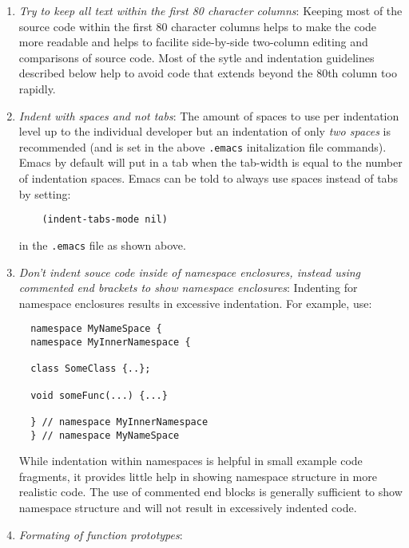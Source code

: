 \begin{enumerate}

{}\item\textit{Try to keep all text within the first 80 character columns}:
Keeping most of the source code within the first 80 character columns helps to
make the code more readable and helps to facilite side-by-side two-column
editing and comparisons of source code.  Most of the sytle and indentation
guidelines described below help to avoid code that extends beyond the 80th
column too rapidly.

{}\item\textit{Indent with spaces and not tabs}: The amount of spaces to use
per indentation level up to the individual developer but an indentation of
only {}\textit{two spaces} is recommended (and is set in the above
{}\texttt{.emacs} initalization file commands).  Emacs by default will put in
a tab when the tab-width is equal to the number of indentation spaces.  Emacs
can be told to always use spaces instead of tabs by setting:

\begin{verbatim}
    (indent-tabs-mode nil)
\end{verbatim}

in the {}\texttt{.emacs} file as shown above.

{}\item\textit{Don't indent souce code inside of namespace enclosures, instead
using commented end brackets to show namespace enclosures}: Indenting for
namespace enclosures results in excessive indentation.  For example, use:

\begin{verbatim}
  namespace MyNameSpace {
  namespace MyInnerNamespace {

  class SomeClass {..};

  void someFunc(...) {...}

  } // namespace MyInnerNamespace
  } // namespace MyNameSpace
\end{verbatim}

While indentation within namespaces is helpful in small example code
fragments, it provides little help in showing namespace structure in more
realistic code.  The use of commented end blocks is generally sufficient to
show namespace structure and will not result in excessively indented code.

{}\item\textit{Formating of function prototypes}:


  \begin{enumerate}


\end{enumerate}
\end{enumerate}
